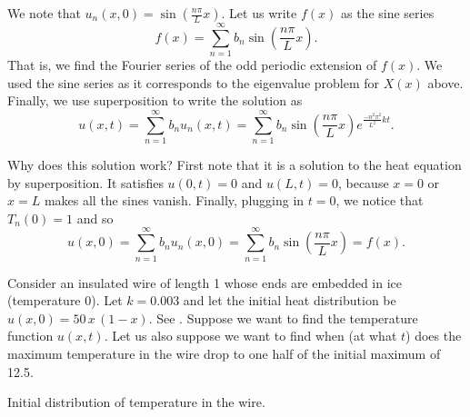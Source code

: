 \documentclass{ximera}
\begin{document}
\begin{exampleSol}
    We note that $u_n(x,0) = \sin \left( \frac{n \pi}{L} x \right)$.  Let us write $f(x)$ as the sine series
    \begin{equation*}
        f(x) = \sum_{n=1}^\infty b_n \sin \left(\frac{n \pi}{L}  x \right) .
    \end{equation*}
    That is, we find the Fourier series of the odd periodic extension of $f(x)$. We used the sine series as it corresponds to the eigenvalue problem for $X(x)$ above. Finally, we use superposition to write the solution as
    \begin{equation*}
        u(x,t) = \sum_{n=1}^\infty b_n u_n(x,t)
        = \sum_{n=1}^\infty b_n \sin \left( \frac{n \pi}{L}  x \right) e^{\frac{-n^2 \pi^2}{L^2} k t} .
    \end{equation*}
\end{exampleSol}

Why does this solution work?  First note that it is a solution to the heat equation by superposition.  It satisfies $u(0,t) = 0$ and $u(L,t) = 0$, because $x=0$ or $x=L$ makes all the sines vanish. Finally, plugging in $t=0$, we notice that $T_n(0) = 1$ and so
\begin{equation*}
    u(x,0) = \sum_{n=1}^\infty b_n u_n(x,0) = \sum_{n=1}^\infty b_n \sin \left( \frac{n \pi}{L} x \right) = f(x) .
\end{equation*}

\begin{example}
    Consider an insulated wire of length 1 whose ends are embedded in ice (temperature 0). Let $k=0.003$ and let the initial heat distribution be $u(x,0) = 50\,x\,(1-x)$. See . Suppose we want to find the temperature function $u(x,t)$.  Let us also suppose we want to find when (at what $t$) does the maximum temperature in the wire  drop to one half of the initial maximum of 12.5.
    
    \begin{myfig}
        \capstart
        \caption{Initial distribution of temperature in the wire.\label{heat:wireexinitfig}}
    \end{myfig}
\end{example}
\end{document}
